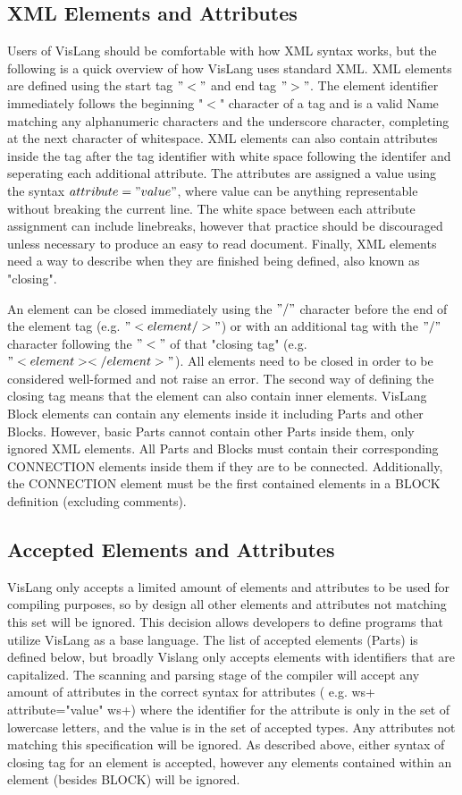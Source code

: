\documentclass[titlepage]{article}
\begin{document}
\subsection{XML Elements and Attributes}
Users of VisLang should be comfortable with how XML syntax works, but the following is a quick overview of how VisLang uses standard XML.
XML elements are defined using the start tag $"<"$ and end tag $">"$.
The element identifier immediately follows the beginning "$<$" character of a tag and is a valid Name matching any alphanumeric characters and the underscore character, completing at the next character of whitespace.
XML elements can also contain attributes inside the tag after the tag identifier with white space following the identifer and seperating each additional attribute.
The attributes are assigned a value using the syntax $attribute="value"$, where value can be anything representable without breaking the current line.
The white space between each attribute assignment can include linebreaks, however that practice should be discouraged unless necessary to produce an easy to read document.
Finally, XML elements need a way to describe when they are finished being defined, also known as "closing".
\par
An element can be closed immediately using the $"/"$ character before the end of the element tag (e.g. $"<element/>"$) or with an additional tag with the $"/"$ character following the $"<"$ of that "closing tag" (e.g. $"<element></element>"$).
All elements need to be closed in order to be considered well-formed and not raise an error.
The second way of defining the closing tag means that the element can also contain inner elements.
VisLang Block elements can contain any elements inside it including Parts and other Blocks.
However, basic Parts cannot contain other Parts inside them, only ignored XML elements.
All Parts and Blocks must contain their corresponding CONNECTION elements inside them if they are to be connected.
Additionally, the CONNECTION element must be the first contained elements in a BLOCK definition (excluding comments).
\subsection{Accepted Elements and Attributes}
VisLang only accepts a limited amount of elements and attributes to be used for compiling purposes, so by design all other elements and attributes not matching this set will be ignored.
This decision allows developers to define programs that utilize VisLang as a base language.
The list of accepted elements (Parts) is defined below, but broadly Vislang only accepts elements with identifiers that are capitalized.
The scanning and parsing stage of the compiler will accept any amount of attributes in the correct syntax for attributes ( e.g.
ws+ attribute="value" ws+) where the identifier for the attribute is only in the set of lowercase letters, and the value is in the set of accepted types.
Any attributes not matching this specification will be ignored.
As described above, either syntax of closing tag for an element is accepted, however any elements contained within an element (besides BLOCK) will be ignored.
\end{document}
